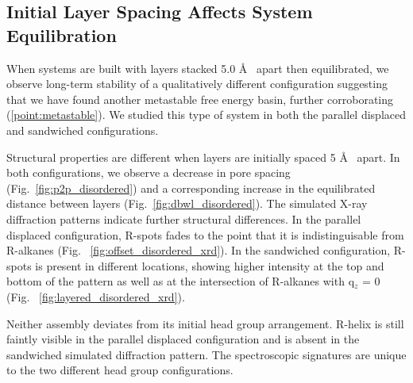 \documentclass{article}
\newcommand{\angstrom}{\textup{\AA}}
\begin{document}
  \subsection{Initial Layer Spacing Affects System Equilibration}

  When systems are built with layers stacked 5.0 \AA~ apart then
  equilibrated, we observe long-term stability of a qualitatively different
  configuration suggesting that we have found another metastable free energy
  basin, further corroborating (\ref{point:metastable}). We studied this type of
  system in both the parallel displaced and sandwiched configurations. 

  Structural properties are different when layers are initially spaced 5 \AA~
  apart. In both configurations, we observe a decrease in pore spacing
  (Fig.~\ref{fig:p2p_disordered}) and a corresponding increase in the equilibrated
  distance between layers (Fig.~\ref{fig:dbwl_disordered}). The simulated X-ray
  diffraction patterns indicate further structural differences. In the parallel
  displaced configuration, R-spots fades to the point that it is indistinguisable
  from R-alkanes (Fig. ~\ref{fig:offset_disordered_xrd}). In the sandwiched
  configuration, R-spots is present in different locations, showing higher
  intensity at the top and bottom of the pattern as well as at the intersection
  of R-alkanes with q$_z$ = 0 (Fig. ~\ref{fig:layered_disordered_xrd}). 

  Neither assembly deviates from its initial head group arrangement. R-helix is still 
  faintly visible in the parallel displaced configuration and is absent in the 
  sandwiched simulated diffraction pattern. The spectroscopic signatures are unique to
  the two different head group configurations.
\end{document}
